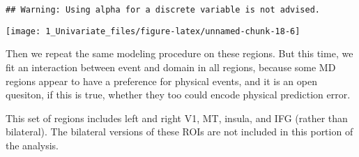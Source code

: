 \documentclass[
]{article}
\begin{document}
\begin{verbatim}
## Warning: Using alpha for a discrete variable is not advised.
\end{verbatim}

\texttt{[image: 1\_Univariate\_files/figure-latex/unnamed-chunk-18-6]}

Then we repeat the same modeling procedure on these regions. But this
time, we fit an interaction between event and domain in all regions,
because some MD regions appear to have a preference for physical events,
and it is an open quesiton, if this is true, whether they too could
encode physical prediction error.

This set of regions includes left and right V1, MT, insula, and IFG
(rather than bilateral). The bilateral versions of these ROIs are not
included in this portion of the analysis.
\end{document}
